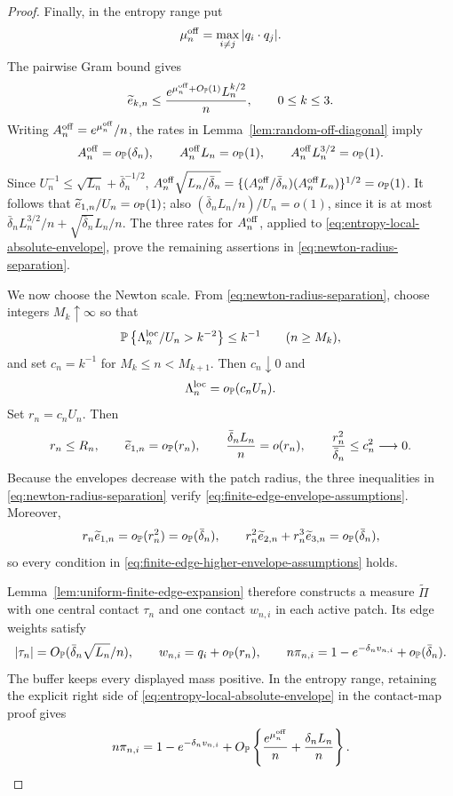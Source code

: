 \begin{proof}
Finally, in the entropy range put
\[
 \mu_n^{\rm off}=\max_{i\ne j}|q_i\cdot q_j|.
\]
The pairwise Gram bound gives
\begin{equation}
\label{eq:entropy-local-absolute-envelope}
 \widetilde e_{k,n}
 \le
 \frac{e^{\mu_n^{\rm off}+O_{\mathbb P}(1)}L_n^{k/2}}n,
 \qquad 0\le k\le3.
\end{equation}
Writing \(A_n^{\rm off}=e^{\mu_n^{\rm off}}/n\), the rates in
Lemma~\ref{lem:random-off-diagonal} imply
\[
 A_n^{\rm off}=o_{\mathbb P}(\delta_n),\qquad
 A_n^{\rm off}L_n=o_{\mathbb P}(1),\qquad
 A_n^{\rm off}L_n^{3/2}=o_{\mathbb P}(1).
\]
Since \(U_n^{-1}\le\sqrt{L_n}+\bar\delta_n^{-1/2}\),
\(A_n^{\rm off}\sqrt{L_n/\bar\delta_n}
=\{(A_n^{\rm off}/\bar\delta_n)(A_n^{\rm off}L_n)\}^{1/2}
=o_{\mathbb P}(1)\).  It follows that
\(\widetilde e_{1,n}/U_n=o_{\mathbb P}(1)\); also
\((\bar\delta_nL_n/n)/U_n=o(1)\), since it is at most
\(\bar\delta_nL_n^{3/2}/n+\sqrt{\bar\delta_n}L_n/n\).  The three rates
for \(A_n^{\rm off}\), applied to
\eqref{eq:entropy-local-absolute-envelope}, prove the remaining assertions
in \eqref{eq:newton-radius-separation}.

We now choose the Newton scale.  From
\eqref{eq:newton-radius-separation}, choose integers \(M_k\uparrow\infty\)
so that
\[
 \mathbb P\left\{\Lambda_n^{\rm loc}/U_n>k^{-2}\right\}\le k^{-1}
 \qquad(n\ge M_k),
\]
and set \(c_n=k^{-1}\) for \(M_k\le n<M_{k+1}\).  Then \(c_n\downarrow0\)
and
\[
 \Lambda_n^{\rm loc}=o_{\mathbb P}(c_nU_n).
\]
Set \(r_n=c_nU_n\).  Then
\[
 r_n\le R_n,\qquad
 \widetilde e_{1,n}=o_{\mathbb P}(r_n),\qquad
 \frac{\bar\delta_nL_n}{n}=o(r_n),\qquad
 \frac{r_n^2}{\bar\delta_n}\le c_n^2\longrightarrow0.
\]
Because the envelopes decrease with the patch radius, the three inequalities
in \eqref{eq:newton-radius-separation} verify
\eqref{eq:finite-edge-envelope-assumptions}.  Moreover,
\[
 r_n\widetilde e_{1,n}=o_{\mathbb P}(r_n^2)=o_{\mathbb P}(\bar\delta_n),
 \qquad
 r_n^2\widetilde e_{2,n}+r_n^3\widetilde e_{3,n}
 =o_{\mathbb P}(\bar\delta_n),
\]
so every condition in
\eqref{eq:finite-edge-higher-envelope-assumptions} holds.

Lemma~\ref{lem:uniform-finite-edge-expansion} therefore constructs a
measure \(\widetilde\Pi\) with one central contact \(\tau_n\) and one
contact \(w_{n,i}\) in each active patch.  Its edge weights satisfy
\begin{equation}
\label{eq:below-simplex-contact-asymptotics}
 |\tau_n|=O_{\mathbb P}(\bar\delta_n\sqrt{L_n}/n),\qquad
 w_{n,i}=q_i+o_{\mathbb P}(r_n),\qquad
 n\pi_{n,i}
 =1-e^{-\delta_nv_{n,i}}+o_{\mathbb P}(\bar\delta_n).
\end{equation}
The buffer keeps every displayed mass positive.  In the entropy range,
retaining the explicit right side of
\eqref{eq:entropy-local-absolute-envelope} in the contact-map proof gives
\begin{equation}
\label{eq:entropy-local-contact-rate}
 n\pi_{n,i}
 =
 1-e^{-\delta_nv_{n,i}}
 +O_{\mathbb P}\left\{
   \frac{e^{\mu_n^{\rm off}}}n+\frac{\delta_nL_n}{n}
 \right\}.
\end{equation}


\end{proof}
